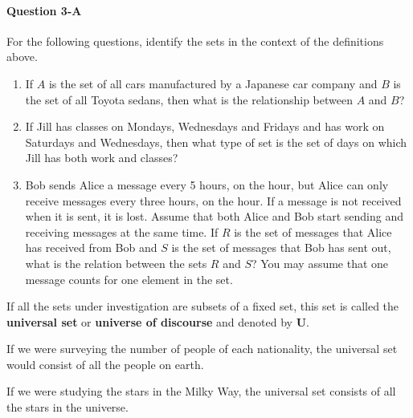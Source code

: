 \paragraph{Question 3-A}
For the following questions, identify the sets in the context of the definitions above.
\begin{enumerate}
    
    \item If $A$ is the set of all cars manufactured by a Japanese car company and $B$ is the set of all Toyota sedans, then what is the relationship between $A$ and $B$?
    \vspace{3em}
    
    \item If Jill has classes on Mondays, Wednesdays and Fridays and has work on Saturdays and Wednesdays, then what type of set is the set of days on which Jill has both work and classes?
    \vspace{3em}
    
    \item Bob sends Alice a message every 5 hours, on the hour, but Alice can only receive messages every three hours, on the hour. If a message is not received when it is sent, it is lost. Assume that both Alice and Bob start sending and receiving messages at the same time. If $R$ is the set of messages that Alice has received from Bob and $S$ is the set of messages that Bob has sent out, what is the relation between the sets $R$ and $S$? You may assume that one message counts for one element in the set.
    \vspace{5em}

    
\end{enumerate}






\begin{definition}
If all the sets under investigation are subsets of a fixed set, this set is called the \textbf{universal set} or \textbf{universe of discourse} and denoted by \textbf{U}.
\end{definition}

\begin{example}
If we were surveying the number of people of each nationality, the universal set would consist of all the people on earth.
\end{example}

\begin{example}
If we were studying the stars in the Milky Way, the universal set consists of all the stars in the universe.
\end{example}

